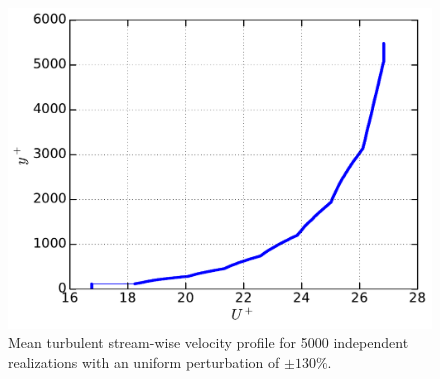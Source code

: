 \documentclass[aps,reprint,amsmath,amssymb,pra,floatfix]{revtex4-1}%
\begin{document}
\begin{figure}[tbh]
\includegraphics[scale=0.45]{figures/Master_averaged_step_profile_5000_assembles_un130}
\caption{\label{fig:mp_un130} Mean turbulent stream-wise velocity profile for 5000 independent realizations with an uniform perturbation of $\pm 130\%$.}
\end{figure}
\end{document}
